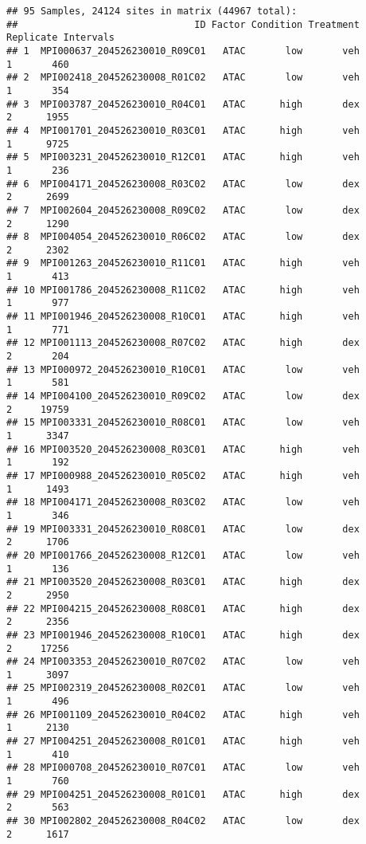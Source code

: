 \documentclass[
]{article}
\begin{document}
\begin{verbatim}
## 95 Samples, 24124 sites in matrix (44967 total):
##                               ID Factor Condition Treatment Replicate Intervals
## 1  MPI000637_204526230010_R09C01   ATAC       low       veh         1       460
## 2  MPI002418_204526230008_R01C02   ATAC       low       veh         1       354
## 3  MPI003787_204526230010_R04C01   ATAC      high       dex         2      1955
## 4  MPI001701_204526230010_R03C01   ATAC      high       veh         1      9725
## 5  MPI003231_204526230010_R12C01   ATAC      high       veh         1       236
## 6  MPI004171_204526230008_R03C02   ATAC       low       dex         2      2699
## 7  MPI002604_204526230008_R09C02   ATAC       low       dex         2      1290
## 8  MPI004054_204526230010_R06C02   ATAC       low       dex         2      2302
## 9  MPI001263_204526230010_R11C01   ATAC      high       veh         1       413
## 10 MPI001786_204526230008_R11C02   ATAC      high       veh         1       977
## 11 MPI001946_204526230008_R10C01   ATAC      high       veh         1       771
## 12 MPI001113_204526230008_R07C02   ATAC      high       dex         2       204
## 13 MPI000972_204526230010_R10C01   ATAC       low       veh         1       581
## 14 MPI004100_204526230010_R09C02   ATAC       low       dex         2     19759
## 15 MPI003331_204526230010_R08C01   ATAC       low       veh         1      3347
## 16 MPI003520_204526230008_R03C01   ATAC      high       veh         1       192
## 17 MPI000988_204526230010_R05C02   ATAC      high       veh         1      1493
## 18 MPI004171_204526230008_R03C02   ATAC       low       veh         1       346
## 19 MPI003331_204526230010_R08C01   ATAC       low       dex         2      1706
## 20 MPI001766_204526230008_R12C01   ATAC       low       veh         1       136
## 21 MPI003520_204526230008_R03C01   ATAC      high       dex         2      2950
## 22 MPI004215_204526230008_R08C01   ATAC      high       dex         2      2356
## 23 MPI001946_204526230008_R10C01   ATAC      high       dex         2     17256
## 24 MPI003353_204526230010_R07C02   ATAC       low       veh         1      3097
## 25 MPI002319_204526230008_R02C01   ATAC       low       veh         1       496
## 26 MPI001109_204526230010_R04C02   ATAC      high       veh         1      2130
## 27 MPI004251_204526230008_R01C01   ATAC      high       veh         1       410
## 28 MPI000708_204526230010_R07C01   ATAC       low       veh         1       760
## 29 MPI004251_204526230008_R01C01   ATAC      high       dex         2       563
## 30 MPI002802_204526230008_R04C02   ATAC       low       dex         2      1617

\end{verbatim}
\end{document}
